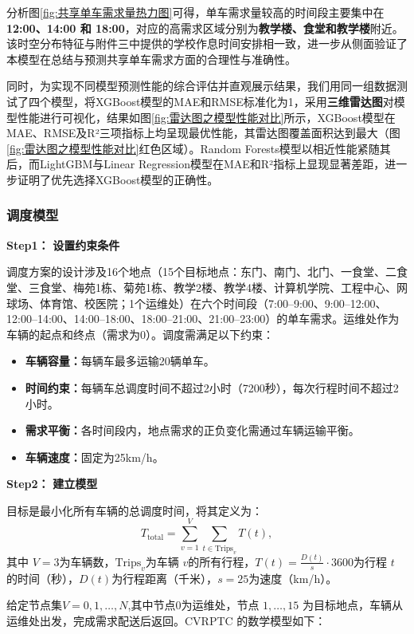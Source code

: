 \documentclass[withoutpreface,bwprint]{cumcmthesis}
\begin{document}
分析图\ref{fig:共享单车需求量热力图}可得，单车需求量较高的时间段主要集中在 \textbf{12:00、14:00 和 18:00}，对应的高需求区域分别为\textbf{教学楼、食堂和教学楼}附近。该时空分布特征与附件三中提供的学校作息时间安排相一致，进一步从侧面验证了本模型在总结与预测共享单车需求方面的合理性与准确性。

同时，为实现不同模型预测性能的综合评估并直观展示结果，我们用同一组数据测试了四个模型，将XGBoost模型的MAE和RMSE标准化为1，采用\textbf{三维雷达图}对模型性能进行可视化，结果如图\ref{fig:雷达图之模型性能对比}所示，XGBoost模型在MAE、RMSE及R²三项指标上均呈现最优性能，其雷达图覆盖面积达到最大（图\ref{fig:雷达图之模型性能对比}红色区域）。Random Forests模型以相近性能紧随其后，而LightGBM与Linear Regression模型在MAE和R²指标上显现显著差距，进一步证明了优先选择XGBoost模型的正确性。

\subsubsection{调度模型}
\textbf{Step1：} \textbf{设置约束条件}

调度方案的设计涉及16个地点（15个目标地点：东门、南门、北门、一食堂、二食堂、三食堂、梅苑1栋、菊苑1栋、教学2楼、教学4楼、计算机学院、工程中心、网球场、体育馆、校医院；1个运维处）在六个时间段（7:00–9:00、9:00–12:00、12:00–14:00、14:00–18:00、18:00–21:00、21:00–23:00）的单车需求。运维处作为车辆的起点和终点（需求为0）。调度需满足以下约束：
\begin{itemize}
    \item \textbf{车辆容量：}每辆车最多运输20辆单车。
    \item \textbf{时间约束：}每辆车总调度时间不超过2小时（7200秒），每次行程时间不超过2小时。
    \item \textbf{需求平衡：}各时间段内，地点需求的正负变化需通过车辆运输平衡。
    \item \textbf{车辆速度：}固定为25km/h。
\end{itemize}
\textbf{Step2：} \textbf{建立模型}

目标是最小化所有车辆的总调度时间，将其定义为：
\begin{equation}
    T_{\text{total}} = \sum_{v=1}^{V} \sum_{t \in \text{Trips}_v} T(t),
\end{equation}
其中 $V = 3$为车辆数，$\text{Trips}_v$为车辆 $v$的所有行程，$T(t) = \frac{D(t)}{s} \cdot 3600$为行程 $t$ 的时间（秒），$D(t)$为行程距离（千米），$s = 25$为速度（km/h）。

给定节点集$V = {0, 1, \dots, N} $,其中节点0为运维处，节点 $1, \dots, 15 $ 为目标地点，车辆从运维处出发，完成需求配送后返回。CVRPTC 的数学模型如下：
\end{document}
